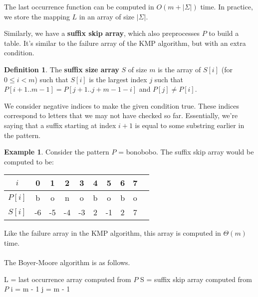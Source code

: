 \documentclass[]{article}
\theoremstyle{definition}
\newtheorem*{defn}{Definition}
\newtheorem{ex}{Example}[section]
\begin{document}
				The last occurrence function can be computed in $O(m + |\Sigma|)$ time. In practice, we store the mapping $L$ in an array of size $|\Sigma|$.

				Similarly, we have a \textbf{suffix skip array}, which also preprocesses $P$ to build a table. It's similar to the failure array of the KMP algorithm, but with an extra condition.
				\begin{defn}
					The \textbf{suffix size array} $S$ of size $m$ is the array of $S[i]$ (for $0 \le i < m$) such that $S[i]$ is the largest index $j$ such that $P[i + 1..m - 1] = P[j + 1..j+ m - 1 - i]$ and $P[j] \ne P[i]$.
				\end{defn}

				We consider negative indices to make the given condition true. These indices correspond to letters that we may not have checked so far. Essentially, we're saying that a suffix starting at index $i + 1$ is equal to some substring earlier in the pattern.

				\begin{ex}
					Consider the pattern $P$ = bonobobo. The suffix skip array would be computed to be:
					\begin{center}
						\begin{tabular}{|c||c|c|c|c|c|c|c|c|c|}
							\hline 
							$i$ & 0 & 1 & 2 & 3 & 4 & 5 & 6 & 7 \\ \hline
							$P[i]$ & b & o & n & o & b & o & b & o \\
							$S[i]$ & -6 & -5 & -4 & -3 & 2 & -1 & 2 & 7 \\ \hline
						\end{tabular}
					\end{center}
				\end{ex}

				Like the failure array in the KMP algorithm, this array is computed in $\Theta(m)$ time.
				\\ \\
				The Boyer-Moore algorithm is as follows. \\
				\begin{algorithm}[H]
					L = last occurrence array computed from $P$\;
					S = suffix skip array computed from $P$\;
					i = m - 1\;
					j = m - 1\;
				\end{algorithm}
\end{document}
